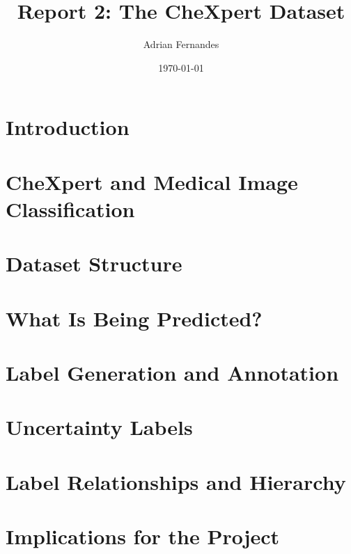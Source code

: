 \documentclass[12pt,a4paper]{article}
\title{Report 2: The CheXpert Dataset}
\author{Adrian Fernandes}
\date{\today}
\begin{document}
\maketitle
\section{Introduction}
\section{CheXpert and Medical Image Classification}
\section{Dataset Structure}
\section{What Is Being Predicted?}
\section{Label Generation and Annotation}
\section{Uncertainty Labels}
\section{Label Relationships and Hierarchy}
\section{Implications for the Project}
\printbibliography
\end{document}
